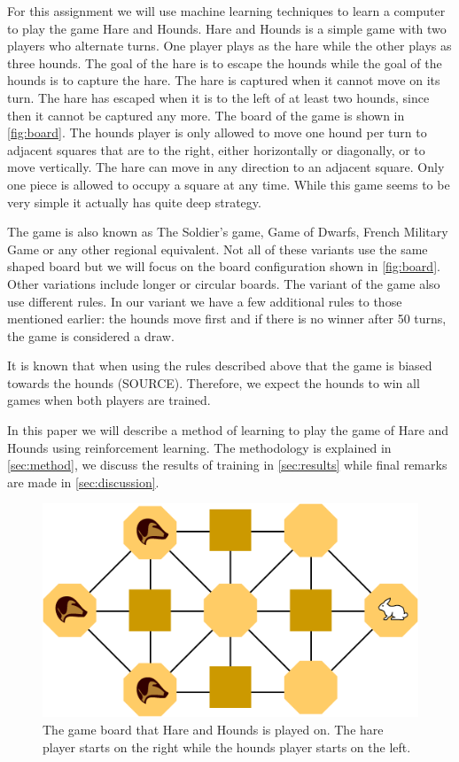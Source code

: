 For this assignment we will use machine learning techniques to learn a computer 
to play the game Hare and Hounds. Hare and Hounds is a simple game with two players who alternate turns. One player plays as the hare while the other plays as three hounds. The goal of the
hare is to escape the hounds while the goal of the hounds is to capture the
hare. The hare is captured when it cannot move on its turn. The hare has escaped
when it is to the left of at least two hounds, since then it cannot be captured any more.
The board of the game is shown in \autoref{fig:board}. The hounds player is only allowed
to move one hound per turn to adjacent squares that are to the right, either horizontally or
diagonally, or to move vertically. The hare can move in any direction to an adjacent
square. Only one piece is allowed to occupy a square at any time. While this game
seems to be very simple it actually has quite deep strategy.

The game is also known as The Soldier's game, Game of Dwarfs, French Military
Game or any other regional equivalent. Not all of these variants use the same
shaped board but we will focus on the board configuration shown in
\autoref{fig:board}. Other variations include longer or circular boards.
The variant of the game also use different rules. In our variant we have a few
additional rules to those mentioned earlier: the hounds move first and if there 
is no winner after 50 turns, the game is considered a draw.

It is known that when using the rules described above that the game is biased
towards the hounds (SOURCE). Therefore, we expect the hounds to win all games when 
both players are trained. 

In this paper we will describe a method of learning to play the game of Hare
and Hounds using reinforcement learning. The methodology is explained in
\autoref{sec:method}, we discuss the results of training in
\autoref{sec:results} while final remarks are made in \autoref{sec:discussion}.

\begin{figure}[h]
	\centering
	\includegraphics[width=.75\textwidth]{Hare_and_Hounds_board.png}
	\caption{The game board that Hare and Hounds is played on. The hare player
		starts on the right while the hounds player starts on the left.}
	\label{fig:board}
\end{figure}
